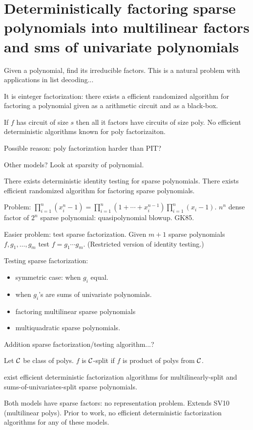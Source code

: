 \section{Deterministically factoring sparse polynomials into multilinear factors and sms of univariate polynomials}

Given a polynomial, find its irreducible factors. This is a natural problem with applications in list decoding...

It is einteger factorization: there exists a efficient randomized algorithm for factoring a polynomial given as a arithmetic circuit and as a black-box. 

If $f$ has circuit of size $s$ then all it factors have circuits of size poly. No efficient deterministic algorithms known for poly factorizaiton. 

Possible reason: poly factorization harder than PIT?

Other models? Look at sparsity of polynomial.

There exists deterministic identity testing for sparse polynomials. There exists efficient randomized algorithm for factoring sparse polynomials.

Problem: $\prod_{i=1}^n (x_i^n-1)=\prod_{i=1}^n (1+\cdots +x_{i}^{n-1})\prod_{i=1}^n(x_i-1)$. $n^n$ dense factor of $2^n$ sparse polynomial: quasipolynomial blowup. GK85.

Easier problem: test sparse factorization. Given $m+1$ sparse polynomials $f,g_1,\ldots, g_m$ test $f=g_1\cdots g_m$. (Restricted version of identity testing.) %

Testing sparse factorization:
\begin{itemize}
\item
symmetric case: when $g_i$ equal.
\item
when $g_i$'s are sums of univariate polynomials.
\item
factoring multilinear sparse polynomials
\item
multiquadratic sparse polynomials.
\end{itemize}
Addition sparse factorization/testing algorithm...?

Let $\cal C$ be class of polys. $f$ is $\cal C$-split if $f$ is product of polys from $\cal C$. 

exist efficient deterministic factorization algorithms for multilinearly-split and sums-of-univariates-split sparse polynomials.

Both models have sparse factors: no representation problem. Extends SV10 (multilinear polys). Prior to work, no efficient deterministic factorization algorithms for any of these models.

